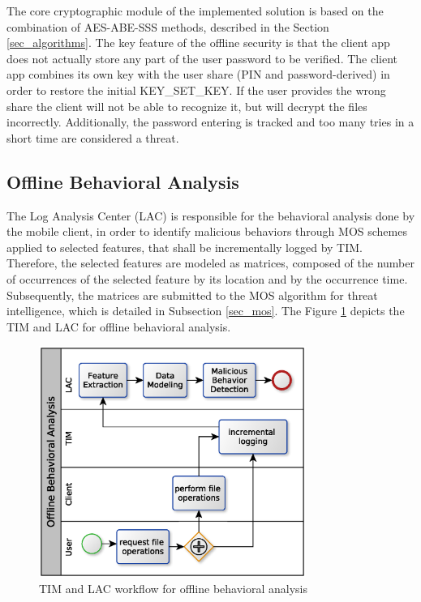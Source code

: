 \documentclass[twocolumn]{svjour3}          %
\begin{document}
The core cryptographic module of the implemented solution is based on the combination of AES-ABE-SSS methods, described in the Section \ref{sec_algorithms}. The key feature of the offline security is that the client app does not actually store any part of the user password to be verified. The client app combines its own key with the user share (PIN and password-derived) in order to restore the initial KEY\_SET\_KEY. If the user provides the wrong share the client will not be able to recognize it, but will decrypt the files incorrectly. Additionally, the password entering is tracked and too many tries in a short time are considered a threat.

\subsection{Offline Behavioral Analysis}
\label{sec_offline_behavioral_analysis}
The Log Analysis Center (LAC) is responsible for the behavioral analysis done by the mobile client, in order to identify malicious behaviors through MOS schemes applied to selected features, that shall be incrementally logged by TIM. Therefore, the selected features are modeled as matrices, composed of the number of occurrences of the selected feature by its location and by the occurrence time. Subsequently, the matrices are submitted to the MOS algorithm for threat intelligence, which is detailed in Subsection \ref{sec_mos}. 
The Figure \ref{fig:8} depicts the TIM and LAC for offline behavioral analysis. 

\begin{figure}[h!]
	\centering
	\includegraphics[width=8.7cm]{figures/mosworkflow.eps}
	\caption{TIM and LAC workflow for offline behavioral analysis}
	\label{fig:8}
\end{figure}
\end{document}
